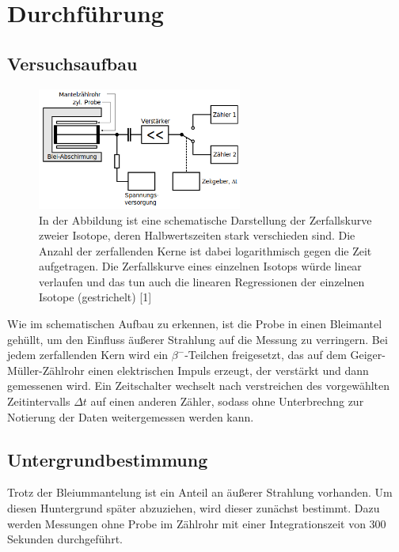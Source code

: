 \newpage
\section{Durchführung}
    \subsection{Versuchsaufbau}

        \FloatBarrier

        \begin{figure}[h]
          \centering
          \includegraphics[width = 0.6\textwidth]{pictures/Aufbau.png}
          \caption{In der Abbildung ist eine schematische Darstellung der Zerfallskurve zweier Isotope, deren Halbwertszeiten stark verschieden sind. Die Anzahl der zerfallenden Kerne ist dabei logarithmisch gegen die Zeit aufgetragen. Die Zerfallskurve eines einzelnen Isotops würde linear verlaufen und das tun auch die linearen Regressionen der einzelnen Isotope (gestrichelt)  [1]}
          \label{fig:Aufbau}
        \end{figure}

        \FloatBarrier

        \noindent
        Wie im schematischen Aufbau zu erkennen, ist die Probe in einen Bleimantel gehüllt, um den Einfluss äußerer Strahlung auf die Messung zu verringern. Bei jedem zerfallenden Kern wird ein
        $\beta^-$-Teilchen freigesetzt, das auf dem Geiger-Müller-Zählrohr einen elektrischen Impuls erzeugt, der verstärkt und dann gemessenen wird. Ein Zeitschalter wechselt nach verstreichen
        des vorgewählten Zeitintervalls $\Delta t$ auf einen anderen Zähler, sodass ohne Unterbrechng zur Notierung der Daten weitergemessen werden kann.

    \subsection{Untergrundbestimmung}
        Trotz der Bleiummantelung ist ein Anteil an äußerer Strahlung vorhanden. Um diesen Huntergrund später abzuziehen, wird dieser zunächst bestimmt. Dazu werden Messungen ohne Probe im 
        Zählrohr mit einer Integrationszeit von 300 Sekunden durchgeführt.


